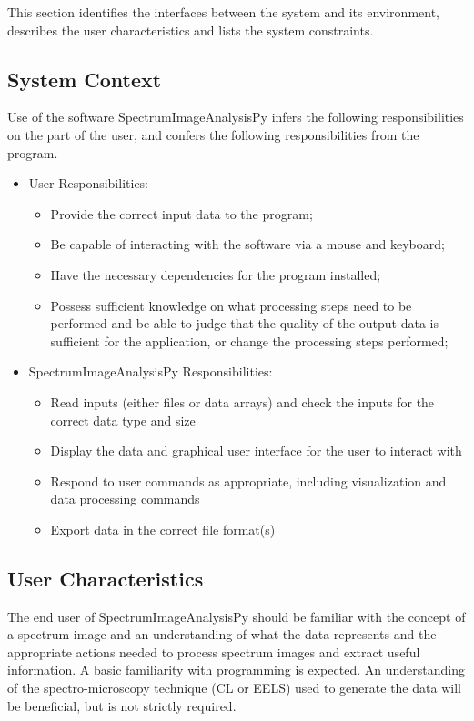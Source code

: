 \documentclass[12pt]{article}
\newcommand{\progname}{SpectrumImageAnalysisPy} %
\begin{document}
This section identifies the interfaces between the system and its environment,
describes the user characteristics and lists the system constraints.

\subsection{System Context}

Use of the software \progname{} infers the following responsibilities on the part of the user, and confers the following responsibilities from the program.

\begin{itemize}
	\item User Responsibilities:
	\begin{itemize}
		\item Provide the correct input data to the program;
		\item Be capable of interacting with the software via a mouse and keyboard;
		\item Have the necessary dependencies for the program installed;
		\item Possess sufficient knowledge on what processing steps need to be performed and be able to judge that the quality of the output data is sufficient for the application, or change the processing steps performed;
	\end{itemize}
	\item \progname{} Responsibilities:
	\begin{itemize}
		\item Read inputs (either files or data arrays) and check the inputs for the correct data type and size
		\item Display the data and graphical user interface for the user to interact with
		\item Respond to user commands as appropriate, including visualization and data processing commands
		\item Export data in the correct file format(s)
	\end{itemize}
\end{itemize}

\subsection{User Characteristics} \label{SecUserCharacteristics}

The end user of \progname{} should be familiar with the concept of a spectrum
image and an understanding of what the data represents and the appropriate
actions needed to process spectrum images and extract useful information. A basic familiarity with programming is expected. An
understanding of the spectro-microscopy technique (CL or EELS) used to generate the data will
be beneficial, but is not strictly required. 
\end{document}

